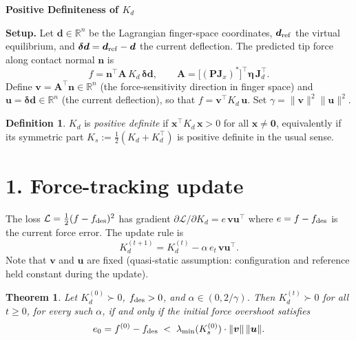 \documentclass[11pt]{article}
\newcommand{\vv}[1]{\bm{#1}}
\newcommand{\mm}[1]{\mathbf{#1}}
\theoremstyle{plain}
\newtheorem{theorem}{Theorem}
\theoremstyle{definition}
\newtheorem{definition}{Definition}
\begin{document}
\begin{center}{\large\bfseries Positive Definiteness of $K_d$}\end{center}
\smallskip

\noindent\textbf{Setup.}
Let $\vv{d}\in\mathbb{R}^n$ be the Lagrangian finger-space coordinates,
$\vv{d}_{\rm ref}$ the virtual equilibrium, and
$\vv{\delta d}=\vv{d}_{\rm ref}-\vv{d}$ the current deflection.
The predicted tip force along contact normal $\vv{n}$ is
\[
  f = \vv{n}^{\top}\mm{A}\,K_d\,\vv{\delta d},
  \qquad
  \mm{A} = \bigl[(\mm{P}\mm{J}_x)^*\bigr]^{\!\top}\mm{\eta}\,\mm{J}_d^{\top}.
\]
Define $\vv{v}=\mm{A}^{\top}\vv{n}\in\mathbb{R}^n$ (the force-sensitivity direction in
finger space) and $\vv{u}=\vv{\delta d}\in\mathbb{R}^n$ (the current deflection),
so that $f=\vv{v}^{\top}K_d\,\vv{u}$.
Set $\gamma=\|\vv{v}\|^2\|\vv{u}\|^2$.

\begin{definition}
$K_d$ is \emph{positive definite} if $\vv{x}^{\top}K_d\,\vv{x}>0$ for all
$\vv{x}\neq\vv{0}$, equivalently if its symmetric part
$K_s:=\tfrac{1}{2}(K_d+K_d^{\top})$ is positive definite in the usual sense.
\end{definition}

\section*{1.\; Force-tracking update}

The loss $\mathcal{L}=\tfrac{1}{2}(f-f_{\rm des})^2$ has gradient
$\partial\mathcal{L}/\partial K_d = e\,\vv{v}\vv{u}^{\top}$
where $e=f-f_{\rm des}$ is the current force error.
The update rule is
\[
  K_d^{(t+1)} = K_d^{(t)} - \alpha\,e_t\,\vv{v}\vv{u}^{\top}.
\]
Note that $\vv{v}$ and $\vv{u}$ are fixed (quasi-static assumption:
configuration and reference held constant during the update).

\begin{theorem}\label{thm:main}
Let $K_d^{(0)}\succ 0$, $f_{\rm des}>0$, and $\alpha\in(0,2/\gamma)$.
Then $K_d^{(t)}\succ 0$ for all $t\geq 0$,
for every such $\alpha$, if and only if the initial force overshoot satisfies
\begin{equation}\label{eq:cond}
  e_0 = f^{(0)} - f_{\rm des}
  \;<\;
  \lambda_{\min}(K_s^{(0)})\cdot\|\vv{v}\|\,\|\vv{u}\|.
\end{equation}
\end{theorem}
\end{document}
